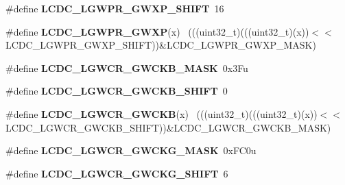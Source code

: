 \begin{DoxyCompactItemize}
\item 
\hypertarget{group___l_c_d_c___register___masks_gad6cb6e75a093a4f5e70663c0157b558d}{}\#define {\bfseries L\+C\+D\+C\+\_\+\+L\+G\+W\+P\+R\+\_\+\+G\+W\+X\+P\+\_\+\+S\+H\+I\+F\+T}~16\label{group___l_c_d_c___register___masks_gad6cb6e75a093a4f5e70663c0157b558d}

\item 
\hypertarget{group___l_c_d_c___register___masks_ga2a082910e355bafbaa5d584bbee11335}{}\#define {\bfseries L\+C\+D\+C\+\_\+\+L\+G\+W\+P\+R\+\_\+\+G\+W\+X\+P}(x)                                          ~(((uint32\+\_\+t)(((uint32\+\_\+t)(x))$<$$<$L\+C\+D\+C\+\_\+\+L\+G\+W\+P\+R\+\_\+\+G\+W\+X\+P\+\_\+\+S\+H\+I\+F\+T))\&L\+C\+D\+C\+\_\+\+L\+G\+W\+P\+R\+\_\+\+G\+W\+X\+P\+\_\+\+M\+A\+S\+K)\label{group___l_c_d_c___register___masks_ga2a082910e355bafbaa5d584bbee11335}

\item 
\hypertarget{group___l_c_d_c___register___masks_gacaaef44d9e3b6960aa127d3ebf64b2ea}{}\#define {\bfseries L\+C\+D\+C\+\_\+\+L\+G\+W\+C\+R\+\_\+\+G\+W\+C\+K\+B\+\_\+\+M\+A\+S\+K}~0x3\+Fu\label{group___l_c_d_c___register___masks_gacaaef44d9e3b6960aa127d3ebf64b2ea}

\item 
\hypertarget{group___l_c_d_c___register___masks_gac90a363bd7156c99ab2dca9742e0c13b}{}\#define {\bfseries L\+C\+D\+C\+\_\+\+L\+G\+W\+C\+R\+\_\+\+G\+W\+C\+K\+B\+\_\+\+S\+H\+I\+F\+T}~0\label{group___l_c_d_c___register___masks_gac90a363bd7156c99ab2dca9742e0c13b}

\item 
\hypertarget{group___l_c_d_c___register___masks_ga872b2f1edb01ae6460517df988c0ecbd}{}\#define {\bfseries L\+C\+D\+C\+\_\+\+L\+G\+W\+C\+R\+\_\+\+G\+W\+C\+K\+B}(x)                                        ~(((uint32\+\_\+t)(((uint32\+\_\+t)(x))$<$$<$L\+C\+D\+C\+\_\+\+L\+G\+W\+C\+R\+\_\+\+G\+W\+C\+K\+B\+\_\+\+S\+H\+I\+F\+T))\&L\+C\+D\+C\+\_\+\+L\+G\+W\+C\+R\+\_\+\+G\+W\+C\+K\+B\+\_\+\+M\+A\+S\+K)\label{group___l_c_d_c___register___masks_ga872b2f1edb01ae6460517df988c0ecbd}

\item 
\hypertarget{group___l_c_d_c___register___masks_gad47a60db1237a1e9fbbcddad74444a0a}{}\#define {\bfseries L\+C\+D\+C\+\_\+\+L\+G\+W\+C\+R\+\_\+\+G\+W\+C\+K\+G\+\_\+\+M\+A\+S\+K}~0x\+F\+C0u\label{group___l_c_d_c___register___masks_gad47a60db1237a1e9fbbcddad74444a0a}

\item 
\hypertarget{group___l_c_d_c___register___masks_ga15c52151e588181358dfe85c770eaa04}{}\#define {\bfseries L\+C\+D\+C\+\_\+\+L\+G\+W\+C\+R\+\_\+\+G\+W\+C\+K\+G\+\_\+\+S\+H\+I\+F\+T}~6\label{group___l_c_d_c___register___masks_ga15c52151e588181358dfe85c770eaa04}


\end{DoxyCompactItemize}
